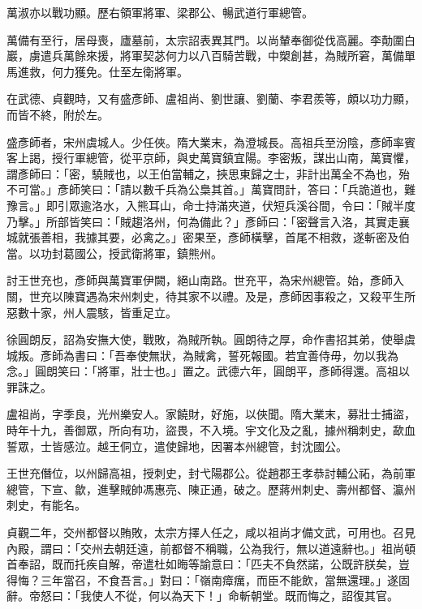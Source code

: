\begin{pinyinscope}
 萬淑亦以戰功顯。歷右領軍將軍、梁郡公、暢武道行軍總管。



 萬備有至行，居母喪，廬墓前，太宗詔表異其門。以尚輦奉御從伐高麗。李勣圍白巖，虜遣兵萬餘來援，將軍契苾何力以八百騎苦戰，中槊創甚，為賊所窘，萬備單馬進救，何力獲免。仕至左衛將軍。



 在武德、貞觀時，又有盛彥師、盧祖尚、劉世讓、劉蘭、李君羨等，頗以功力顯，而皆不終，附於左。



 盛彥師者，宋州虞城人。少任俠。隋大業末，為澄城長。高祖兵至汾陰，彥師率賓客上謁，授行軍總管，從平京師，與史萬寶鎮宜陽。李密叛，謀出山南，萬寶懼，謂彥師曰：「密，驍賊也，以王伯當輔之，挾思東歸之士，非計出萬全不為也，殆不可當。」彥師笑曰：「請以數千兵為公梟其首。」萬寶問計，答曰：「兵詭道也，難豫言。」即引眾逾洛水，入熊耳山，命士持滿夾道，伏短兵溪谷間，令曰：「賊半度乃擊。」所部皆笑曰：「賊趨洛州，何為備此？」彥師曰：「密聲言入洛，其實走襄城就張善相，我據其要，必禽之。」密果至，彥師橫擊，首尾不相救，遂斬密及伯當。以功封葛國公，授武衛將軍，鎮熊州。



 討王世充也，彥師與萬寶軍伊闕，絕山南路。世充平，為宋州總管。始，彥師入關，世充以陳寶遇為宋州刺史，待其家不以禮。及是，彥師因事殺之，又殺平生所惡數十家，州人震駭，皆重足立。



 徐圓朗反，詔為安撫大使，戰敗，為賊所執。圓朗待之厚，命作書招其弟，使舉虞城叛。彥師為書曰：「吾奉使無狀，為賊禽，誓死報國。若宜善侍毋，勿以我為念。」圓朗笑曰：「將軍，壯士也。」置之。武德六年，圓朗平，彥師得還。高祖以罪誅之。



 盧祖尚，字季良，光州樂安人。家饒財，好施，以俠聞。隋大業末，募壯士捕盜，時年十九，善御眾，所向有功，盜畏，不入境。宇文化及之亂，據州稱刺史，歃血誓眾，士皆感泣。越王侗立，遣使歸地，因署本州總管，封沈國公。



 王世充僭位，以州歸高祖，授刺史，封弋陽郡公。從趙郡王孝恭討輔公祏，為前軍總管，下宣、歙，進擊賊帥馮惠亮、陳正通，破之。歷蔣州刺史、壽州都督、瀛州刺史，有能名。



 貞觀二年，交州都督以賄敗，太宗方擇人任之，咸以祖尚才備文武，可用也。召見內殿，謂曰：「交州去朝廷遠，前都督不稱職，公為我行，無以道遠辭也。」祖尚頓首奉詔，既而托疾自解，帝遣杜如晦等諭意曰：「匹夫不負然諾，公既許朕矣，豈得悔？三年當召，不食吾言。」對曰：「嶺南瘴癘，而臣不能飲，當無還理。」遂固辭。帝怒曰：「我使人不從，何以為天下！」命斬朝堂。既而悔之，詔復其官。




\end{pinyinscope}
